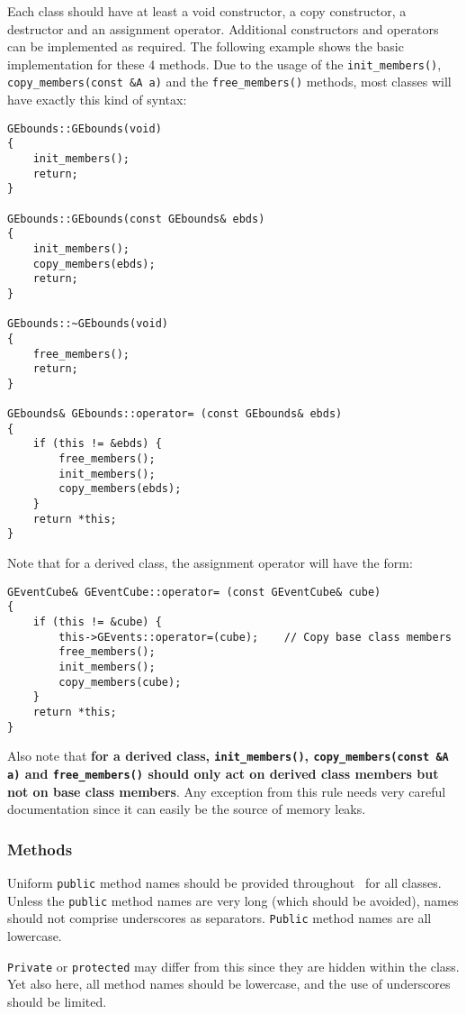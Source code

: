 \documentclass{article}[12pt,a4]
\begin{document}
Each class should have at least a void constructor, a copy constructor, a destructor and
an assignment operator.
Additional constructors and operators can be implemented as required.
The following example shows the basic implementation for these 4 methods.
Due to the usage of the {\tt init\_members()}, {\tt copy\_members(const \&A a)} and the
{\tt free\_members()} methods, most classes will have exactly this kind of syntax:
\begin{verbatim}
GEbounds::GEbounds(void)
{
    init_members();
    return;
}

GEbounds::GEbounds(const GEbounds& ebds)
{
    init_members();
    copy_members(ebds);
    return;
}

GEbounds::~GEbounds(void)
{
    free_members();
    return;
}

GEbounds& GEbounds::operator= (const GEbounds& ebds)
{
    if (this != &ebds) {
        free_members();
        init_members();
        copy_members(ebds);
    }
    return *this;
}
\end{verbatim}
Note that for a derived class, the assignment operator will have the form:
\begin{verbatim}
GEventCube& GEventCube::operator= (const GEventCube& cube)
{
    if (this != &cube) {
        this->GEvents::operator=(cube);    // Copy base class members
        free_members();
        init_members();
        copy_members(cube);
    }
    return *this;
}
\end{verbatim}
Also note that {\bf for a derived class, {\tt init\_members()}, {\tt copy\_members(const \&A a)}
and {\tt free\_members()} should only act on derived class members but not on
base class members}.
Any exception from this rule needs very careful documentation since it can easily be
the source of memory leaks.


\subsubsection{Methods}

Uniform {\tt public} method names should be provided throughout \this\ for all classes.
Unless the {\tt public} method names are very long (which should be avoided), names
should not comprise underscores as separators.
{\tt Public} method names are all lowercase.

{\tt Private} or {\tt protected} may differ from this since they are hidden within the class.
Yet also here, all method names should be lowercase, and the use of underscores
should be limited.
 
\end{document}
